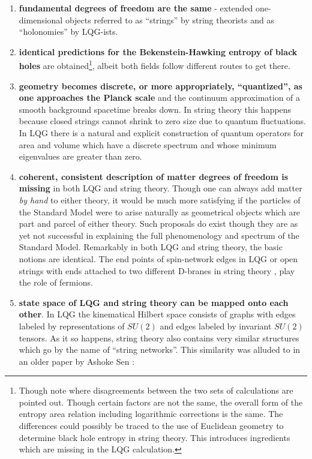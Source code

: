 \documentclass[submission, Phys]{SciPost}
\begin{document}
\begin{enumerate}
	\item \textbf{fundamental degrees of freedom are the same} - extended one-dimensional objects referred to as ``strings'' by string theorists and as ``holonomies'' by LQG-ists.
	\item \textbf{identical predictions \cite{Kaul2012Entropy,Sen2012Logarithmic} for the Bekenstein-Hawking entropy of black holes} are obtained\footnote{Though note \cite{Sen2012Logarithmic,Sen2014Microscopic} where disagreements between the two sets of calculations are pointed out. Though certain factors are not the same, the overall form of the entropy area relation including logarithmic corrections is the same. The differences could possibly be traced to the use of Euclidean geometry to determine black hole entropy in string theory. This introduces ingredients which are missing in the LQG calculation.}, albeit both fields follow different routes to get there.
	\item \textbf{geometry becomes discrete, or more appropriately, ``quantized'', as one approaches the Planck scale} and the continuum approximation of a smooth background spacetime breaks down. In string theory this happens because closed strings cannot shrink to zero size due to quantum fluctuations. In LQG there is a natural and explicit construction \cite{Ashtekar1992Weaving,Rovelli1993Area,Rovelli1994Discreteness} of quantum operators for area and volume which have a discrete spectrum and whose minimum eigenvalues are greater than zero.
	\item \textbf{coherent, consistent description of matter degrees of freedom is missing} in both LQG and string theory. Though one can always add matter \emph{by hand} to either theory, it would be much more satisfying if the particles of the Standard Model were to arise naturally as geometrical objects which are part and parcel of either theory. Such proposals do exist \cite{Bilson-Thompson2005A-topological,Bilson-Thompson2006Quantum,Wan2007Braid, Vaid2010Embedding} though they are as yet not successful in explaining the full phenomenology and spectrum of the Standard Model. Remarkably in both LQG and string theory, the basic notions are identical. The end points of spin-network edges in LQG \cite{Morales-Tecotl1994Fermions} or open strings with ends attached to two different D-branes in string theory \cite[Ch. 21]{Zwiebach2009A-First}, play the role of fermions.
	\item \textbf{state space of LQG and string theory can be mapped onto each other}. In LQG the kinematical Hilbert space consists of graphs with edges labeled by representations of $ SU(2) $ and edges labeled by invariant $ SU(2) $ tensors. As it so happens, string theory also contains very similar structures which go by the name of ``string networks''. This similarity was alluded to in an older paper by Ashoke Sen \cite{Sen1997String}:

\end{enumerate}
\end{document}
